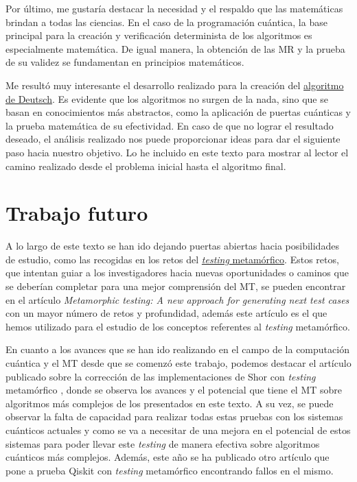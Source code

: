 Por último, me gustaría destacar la necesidad y el respaldo que las matemáticas brindan a todas las ciencias. En el caso de la programación cuántica, la base principal para la creación y verificación determinista de los algoritmos es especialmente matemática. De igual manera, la obtención de las MR y la prueba de su validez se fundamentan en principios matemáticos.\newline

Me resultó muy interesante el desarrollo realizado para la creación del \hyperref[Sec3.2:Deutsch]{algoritmo de Deutsch}.  Es evidente que los algoritmos no surgen de la nada, sino que se basan en conocimientos más abstractos, como la aplicación de puertas cuánticas y la prueba matemática de su efectividad. En caso de que no lograr el resultado deseado, el análisis realizado nos puede proporcionar ideas para dar el siguiente paso hacia nuestro objetivo. Lo he incluido en este texto para mostrar al lector el camino realizado desde el problema inicial hasta el algoritmo final.

\section{Trabajo futuro}
\label{Sec5.2:Futuro}

A lo largo de este texto se han ido dejando puertas abiertas hacia posibilidades de estudio, como las recogidas en los retos del \hyperref[Sec2.4:Metamorfico]{\textit{testing} metamórfico}. Estos retos, que intentan guiar a los investigadores hacia nuevas oportunidades o caminos que se deberían completar para una mejor comprensión del MT, se pueden encontrar en el artículo \textit{Metamorphic testing: A new approach for generating next test cases} \cite{AR:MTmain:2008} con un mayor número de retos y profundidad, además este artículo es el que hemos utilizado para el estudio de los conceptos referentes al \textit{testing} metamórfico.\newline

En cuanto a los avances que se han ido realizando en el campo de la computación cuántica y el MT desde que se comenzó este trabajo, podemos destacar el artículo publicado sobre la corrección de las implementaciones de Shor con \textit{testing} metamórfico \cite{metamorphicShor:2022}, donde se observa los avances y el potencial que tiene el MT sobre algoritmos más complejos de los presentados en este texto. A su vez, se puede observar la falta de capacidad para realizar todas estas pruebas con los sistemas cuánticos actuales y como se va a necesitar de una mejora en el potencial de estos sistemas para poder llevar este \textit{testing} de manera efectiva sobre algoritmos cuánticos más complejos. Además, este año se ha publicado otro artículo que pone a prueba Qiskit con \textit{testing} metamórfico \cite{AR:QiskitMT:2023} encontrando fallos en el mismo.\newline

